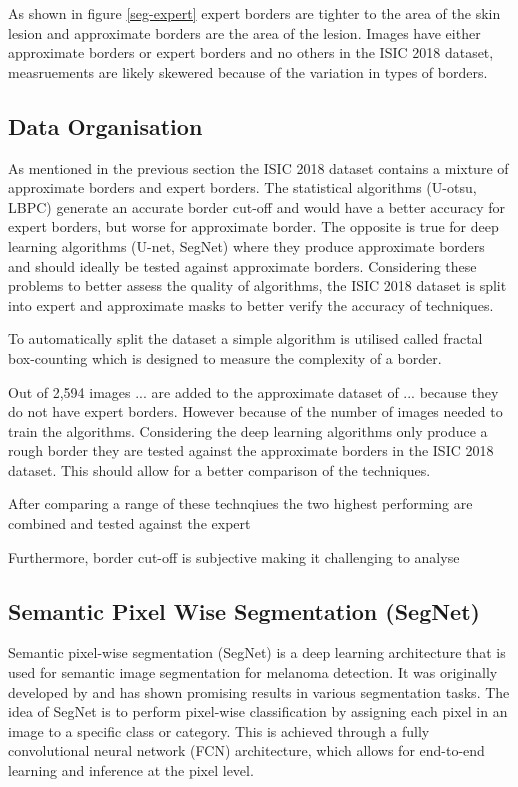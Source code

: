 As shown in figure \ref{seg-expert} expert borders are tighter to the area of the skin lesion and approximate borders are the area of the lesion. Images have either approximate borders or expert borders and no others in the ISIC 2018 dataset, measruements are likely skewered because of the variation in types of borders.


\subsection{Data Organisation}
As mentioned in the previous section the ISIC 2018 dataset contains a mixture of approximate borders and expert borders. The statistical algorithms (U-otsu, LBPC) generate an accurate border cut-off and would have a better accuracy for expert borders, but worse for approximate border. The opposite is true for deep learning algorithms (U-net, SegNet) where they produce approximate borders and should ideally be tested against approximate borders. Considering these problems to better assess the quality of algorithms, the ISIC 2018 dataset is split into expert and approximate masks to better verify the accuracy of techniques.

To automatically split the dataset a simple algorithm is utilised called fractal box-counting which is designed to measure the complexity of a border. 

Out of 2,594 images ... are added to the approximate dataset of ... because they do not have expert borders. However because of the number of images needed to train the algorithms. Considering the deep learning algorithms only produce a rough border they are tested against the approximate borders in the ISIC 2018 dataset. This should allow for a better comparison of the techniques.

After comparing a range of these technqiues the two highest performing are combined and tested against the expert

Furthermore, border cut-off is subjective making it challenging to analyse


\subsection{Semantic Pixel Wise Segmentation (SegNet)}
Semantic pixel-wise segmentation (SegNet) is a deep learning architecture that is used for semantic image segmentation for melanoma detection. It was originally developed by\cite{chen2018} and has shown promising results in various segmentation tasks. The idea of SegNet is to perform pixel-wise classification by assigning each pixel in an image to a specific class or category. This is achieved through a fully convolutional neural network (FCN) architecture, which allows for end-to-end learning and inference at the pixel level. 

